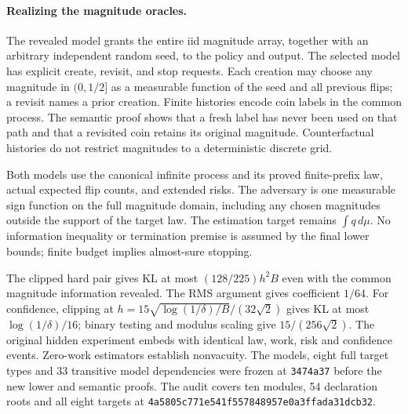 \paragraph{Realizing the magnitude oracles.}
The revealed model grants the entire iid magnitude array, together with an
arbitrary independent random seed, to the policy and output. The selected
model has explicit create, revisit, and stop requests. Each creation may
choose any magnitude in $(0,1/2]$ as a measurable function of the seed and
all previous flips; a revisit names a prior creation. Finite histories
encode coin labels in the common process. The semantic proof shows that
a fresh label has never been used on that path and that a revisited coin
retains its original magnitude. Counterfactual histories do not restrict
magnitudes to a deterministic discrete grid.

Both models use the canonical infinite process and its proved finite-prefix
law, actual expected flip counts, and extended risks. The adversary is one
measurable sign function on the full magnitude domain, including any chosen
magnitudes outside the support of the target law. The estimation target
remains $\int q\,d\mu$. No information inequality or termination premise is
assumed by the final lower bounds; finite budget implies almost-sure stopping.

The clipped hard pair gives KL at most $(128/225)h^2B$ even with the common
magnitude information revealed. The RMS argument gives coefficient $1/64$.
For confidence, clipping at
$h=15\sqrt{\log(1/\delta)/B}/(32\sqrt2)$ gives KL at most
$\log(1/\delta)/16$; binary testing and modulus scaling give
$15/(256\sqrt2)$. The original hidden experiment embeds with identical law,
work, risk and confidence events. Zero-work estimators establish nonvacuity.
The models, eight full target types and 33 transitive model dependencies
were frozen at \nolinkurl{3474a37} before the new lower and semantic proofs.
The audit covers ten modules, 54 declaration roots and all eight targets
at \nolinkurl{4a5805c771e541f557848957e0a3ffada31dcb32}.

